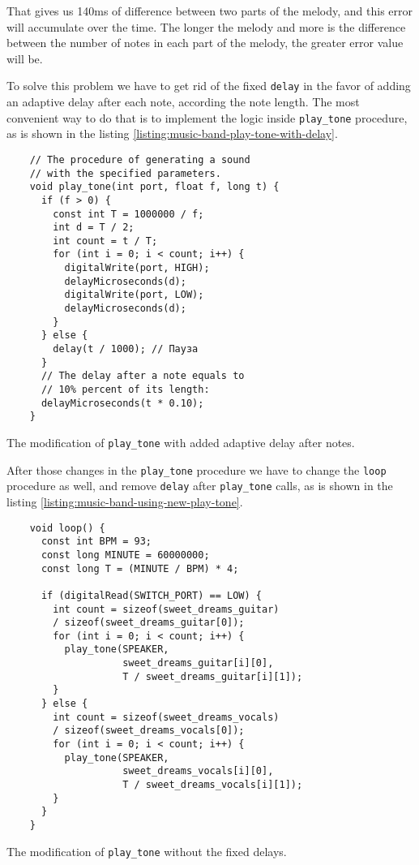 \documentclass[../sparc.tex]{subfiles}
\begin{document}
That gives us 140ms of difference between two parts of the melody, and this
error will accumulate over the time.  The longer the melody and more is the
difference between the number of notes in each part of the melody, the greater
error value will be.

To solve this problem we have to get rid of the fixed \texttt{delay} in the
favor of adding an adaptive delay after each note, according the note length.
The most convenient way to do that is to implement the logic inside
\texttt{play\_tone} procedure, as is shown in the listing
\ref{listing:music-band-play-tone-with-delay}.

\begin{listing}[H]
  \begin{verbatim}
    // The procedure of generating a sound
    // with the specified parameters.
    void play_tone(int port, float f, long t) {
      if (f > 0) {
        const int T = 1000000 / f;
        int d = T / 2;
        int count = t / T;
        for (int i = 0; i < count; i++) {
          digitalWrite(port, HIGH);
          delayMicroseconds(d);
          digitalWrite(port, LOW);
          delayMicroseconds(d);
        }
      } else {
        delay(t / 1000); // Пауза
      }
      // The delay after a note equals to
      // 10% percent of its length:
      delayMicroseconds(t * 0.10);
    }
  \end{verbatim}
  \caption{The modification of \texttt{play\_tone} with added adaptive delay
    after notes.}
  \label{listing:music-band-play-tone-with-delay}
\end{listing}

\newpage
After those changes in the \texttt{play\_tone} procedure we have to change the
\texttt{loop} procedure as well, and remove \texttt{delay} after
\texttt{play\_tone} calls, as is shown in the listing
\ref{listing:music-band-using-new-play-tone}.

\begin{listing}[H]
  \begin{verbatim}
    void loop() {
      const int BPM = 93;
      const long MINUTE = 60000000;
      const long T = (MINUTE / BPM) * 4;

      if (digitalRead(SWITCH_PORT) == LOW) {
        int count = sizeof(sweet_dreams_guitar)
        / sizeof(sweet_dreams_guitar[0]);
        for (int i = 0; i < count; i++) {
          play_tone(SPEAKER,
                    sweet_dreams_guitar[i][0],
                    T / sweet_dreams_guitar[i][1]);
        }
      } else {
        int count = sizeof(sweet_dreams_vocals)
        / sizeof(sweet_dreams_vocals[0]);
        for (int i = 0; i < count; i++) {
          play_tone(SPEAKER,
                    sweet_dreams_vocals[i][0],
                    T / sweet_dreams_vocals[i][1]);
        }
      }
    }
  \end{verbatim}
  \caption{The modification of \texttt{play\_tone} without the fixed delays.}
  \label{listing:music-band-using-new-play-tone}
\end{listing}
\end{document}
